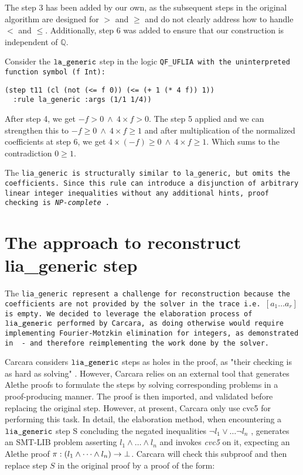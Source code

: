 The step 3 has been added by our own, as the subsequent steps in the original algorithm are designed for $>$ and $\geq$ and do not clearly address how to handle $<$ and $\leq$.
Additionally, step 6  was added to ensure that our construction is independent of $\mathbb{Q}$.

\begin{example}
Consider the $\tt{la\_generic}$ step in the logic \tt{QF\_UFLIA} with the uninterpreted function symbol \lstinline[language=SMT]|(f Int)|:
\begin{lstlisting}[language=SMT,label={lst:smtexampleinput}]
(step t11 (cl (not (<= f 0)) (<= (+ 1 (* 4 f)) 1))
  :rule la_generic :args (1/1 1/4))
\end{lstlisting}
After step 4, we get $- f > 0 ~\land~ 4 \times f > 0$. The step 5 applied and we can strengthen this to
$- f \geq 0 ~\land~ 4 \times f \geq 1$ and after multiplication of the normalized coefficients at step 6, we get $4 \times(- f) \geq 0 ~\land~ 4 \times f \geq 1$.
Which sums to the contradiction  $0 \geq 1$. 
\end{example}


The \tt{lia\_generic} is structurally similar to \tt{la\_generic}, but omits the coefficients.
Since this rule can introduce a disjunction of arbitrary linear integer inequalities without any additional hints, proof checking is \emph{NP-complete} \cite{Schrijver:lia}.

\section{The approach to reconstruct lia\_generic step}

The \tt{lia\_generic} represent a challenge for reconstruction because the coefficients are not provided by the solver in the trace i.e. \colorbox{orange!30}{$[a_1 \dots a_r]$} is empty.
We decided to leverage the elaboration process of $\tt{lia\_generic}$ performed by Carcara, as doing otherwise would require implementing Fourier-Motzkin elimination for integers, as demonstrated in \cite{omegatest,micromega} -
and therefore reimplementing the work done by the solver.

Carcara considers $\tt{lia\_generic}$ steps as holes in the proof,  as "their checking is as hard as solving" \cite[\S 3.2]{carcara}.
However, Carcara relies on an external tool that generates Alethe proofs to formulate the steps by solving corresponding problems in a proof-producing manner.
The proof is then imported, and validated before replacing the original step. However, at present, Carcara only use cvc5 for performing this task.
In detail, the elaboration method, when encountering a $\tt{lia\_generic}$ step S concluding the negated inequalities $ \neg l_1 \lor \dots \neg l_n$ , generates an SMT-LIB problem asserting $l_1 \land \dots \land l_n$ and invokes \emph{cvc5} on it, expecting an Alethe proof $\pi : (l_1 \land \dots \land l_n) \ra \bot$.
Carcara will check this subproof and then replace step $S$ in the original proof by a proof of the form:

